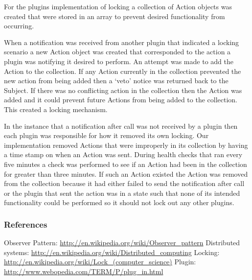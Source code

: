 \documentclass[12pt,english,a4paper,]{article}
\begin{document}
\bigskip

For the plugins implementation of locking a collection of Action objects was created that were stored in an array to prevent desired functionality from occurring.  

\bigskip

When a notification was received from another plugin that indicated a locking scenario a new Action object was created that corresponded to the action a plugin was notifying it desired to perform.  An attempt was made to add the Action to the collection.  If any Action currently in the collection prevented the new action from being added then a ‘veto’ notice was returned back to the Subject.  If there was no conflicting action in the collection then the Action was added and it could prevent future Actions from being added to the collection.  This created a locking mechanism.

\bigskip

In the instance that a notification after call was not received by a plugin then each plugin was responsible for how it removed its own locking.  Our implementation removed Actions that were improperly in its collection by having a time stamp on when an Action was sent.  During health checks that ran every five minutes a check was performed to see if an Action had been in the collection for greater than three minutes.  If such an Action existed the Action was removed from the collection because it had either failed to send the notification after call or the plugin that sent the action was in a state such that none of its intended functionality could be performed so it should not lock out any other plugins.


\subsubsection{References}\label{references}

\footnotesize 

Observer Pattern: \url{http://en.wikipedia.org/wiki/Observer_pattern}
\newline
Distributed systems: \url{http://en.wikipedia.org/wiki/Distributed_computing}
\newline
Locking: \url{http://en.wikipedia.org/wiki/Lock_(computer_science)}
\newline
Plugin: \url{http://www.webopedia.com/TERM/P/plug_in.html}
\end{document}
